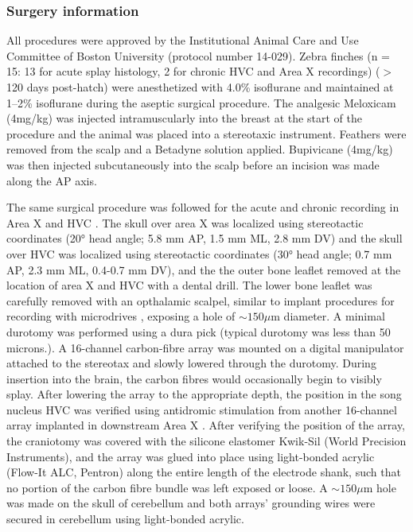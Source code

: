 \documentclass[10pt,letterpaper]{article}
\let\oldmarginpar\marginpar
\renewcommand{\marginpar}[1]{\oldmarginpar{\linespread{1}\scriptsize{#1}}}
\begin{document}
\subsubsection{Surgery information}

All procedures were approved by the Institutional Animal Care and Use
Committee of Boston University (protocol number 14-029). Zebra finches
(n = 15: 13 for acute splay histology, 2\marginpar{Include the third?}
for chronic HVC and Area X recordings) ($>$120 days post-hatch) were
anesthetized with 4.0\% isoflurane and maintained at 1--2\% isoflurane
during the aseptic surgical procedure. The analgesic Meloxicam
(4mg/kg) was injected intramuscularly into the breast at the start of
the procedure and the animal was placed into a stereotaxic
instrument. Feathers were removed from the scalp and a Betadyne
solution applied. Bupivicane (4mg/kg) was then injected subcutaneously
into the scalp before an incision was made along the AP axis.

The same surgical procedure was followed for the acute and chronic
recording in Area X and HVC \cite{Guitchounts2013electrode}. The skull
over area X was localized using stereotactic coordinates (20° head
angle; 5.8 mm AP, 1.5 mm ML, 2.8 mm DV) and the skull over HVC was
localized using stereotactic coordinates (30° head angle; 0.7 mm AP,
2.3 mm ML, 0.4-0.7 mm DV), and the the outer bone leaflet removed at
the location of area X and HVC with a dental drill. The lower bone
leaflet was carefully removed with an opthalamic scalpel, similar to
implant procedures for recording with microdrives
\cite{Long2010synfire}, exposing a hole of $\sim 150 \mu$m diameter. A
minimal durotomy was performed using a dura pick (typical durotomy was
less than 50 microns.). A 16-channel carbon-fibre array
\cite{Guitchounts2013electrode} was mounted on a digital manipulator
attached to the stereotax and slowly lowered through the
durotomy. During insertion into the brain, the carbon fibres would
occasionally begin to visibly splay. After lowering the array to the
appropriate depth, the position in the song nucleus HVC was verified
using antidromic stimulation from another 16-channel array implanted
in downstream Area X
\cite{Hahnloser2002sparse,Guitchounts2013electrode}.  After verifying
the position of the array, the craniotomy was covered with the
silicone elastomer Kwik-Sil (World Precision Instruments), and the
array was glued into place using light-bonded acrylic (Flow-It ALC,
Pentron) along the entire length of the electrode shank, such that no
portion of the carbon fibre bundle was left exposed or loose. A $\sim
150\mu$m hole was made on the skull of cerebellum and both arrays’
grounding wires were secured in cerebellum using light-bonded acrylic.
\end{document}
